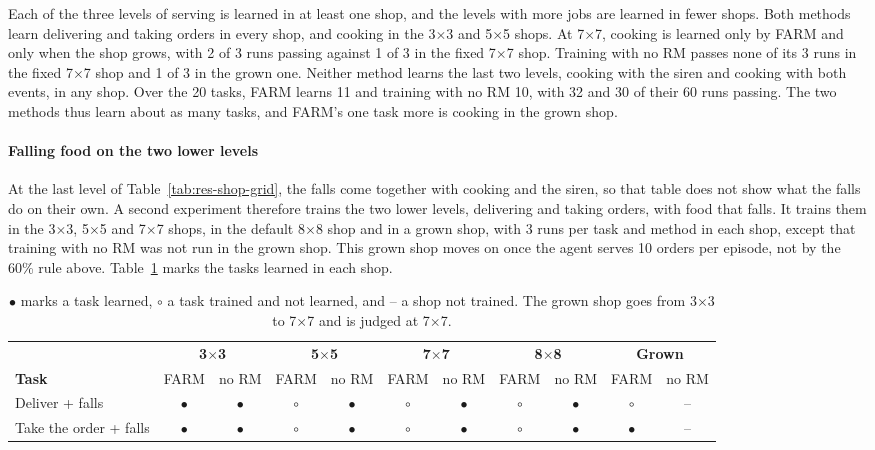 \documentclass[11pt,english,listoffigures,listoftables]{tfgetsinf}
\begin{document}
Each of the three levels of serving is learned in at least one shop, and the levels with more jobs are learned in fewer shops. Both methods learn delivering and taking orders in every shop, and cooking in the 3$\times$3 and 5$\times$5 shops. At 7$\times$7, cooking is learned only by FARM and only when the shop grows, with 2 of 3 runs passing against 1 of 3 in the fixed 7$\times$7 shop. Training with no RM passes none of its 3 runs in the fixed 7$\times$7 shop and 1 of 3 in the grown one. Neither method learns the last two levels, cooking with the siren and cooking with both events, in any shop. Over the 20 tasks, FARM learns 11 and training with no RM 10, with 32 and 30 of their 60 runs passing. The two methods thus learn about as many tasks, and FARM's one task more is cooking in the grown shop.

\paragraph{Falling food on the two lower levels} At the last level of Table~\ref{tab:res-shop-grid}, the falls come together with cooking and the siren, so that table does not show what the falls do on their own. A second experiment therefore trains the two lower levels, delivering and taking orders, with food that falls. It trains them in the 3$\times$3, 5$\times$5 and 7$\times$7 shops, in the default 8$\times$8 shop and in a grown shop, with 3 runs per task and method in each shop, except that training with no RM was not run in the grown shop. This grown shop moves on once the agent serves 10 orders per episode, not by the 60\% rule above. Table~\ref{tab:res-shop-falls} marks the tasks learned in each shop.

\begin{table}[H]
\centering
\footnotesize
\setlength{\tabcolsep}{3pt}
\renewcommand{\arraystretch}{1.2}
\begin{tabular}{@{}l*{10}{c}@{}}
\toprule
 & \multicolumn{2}{c}{\textbf{3$\times$3}} & \multicolumn{2}{c}{\textbf{5$\times$5}} & \multicolumn{2}{c}{\textbf{7$\times$7}} & \multicolumn{2}{c}{\textbf{8$\times$8}} & \multicolumn{2}{c}{\textbf{Grown}} \\
\cmidrule(lr){2-3} \cmidrule(lr){4-5} \cmidrule(lr){6-7} \cmidrule(lr){8-9} \cmidrule(l){10-11}
\textbf{Task} & FARM & no RM & FARM & no RM & FARM & no RM & FARM & no RM & FARM & no RM \\ \midrule
Deliver + falls & $\bullet$ & $\bullet$ & $\circ$ & $\bullet$ & $\circ$ & $\bullet$ & $\circ$ & $\bullet$ & $\circ$ & -- \\
Take the order + falls & $\bullet$ & $\bullet$ & $\circ$ & $\bullet$ & $\circ$ & $\bullet$ & $\circ$ & $\bullet$ & $\bullet$ & -- \\ \bottomrule
\end{tabular}
\caption[Falling food on the two lower levels]{$\bullet$ marks a task learned, $\circ$ a task trained and not learned, and -- a shop not trained. The grown shop goes from 3$\times$3 to 7$\times$7 and is judged at 7$\times$7.}
\label{tab:res-shop-falls}
\end{table}
\end{document}
